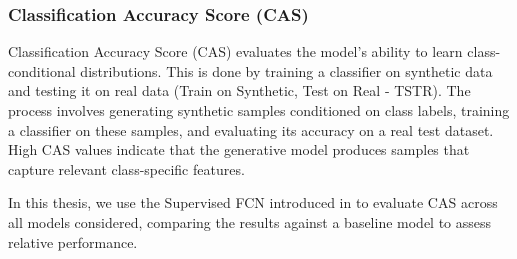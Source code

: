 \documentclass[../../thesis.tex]{subfiles}
\begin{document}
\subsubsection{Classification Accuracy Score (CAS)}
Classification Accuracy Score (CAS) evaluates the model's ability to learn class-conditional distributions. This is done by training a classifier on synthetic data and testing it on real data (Train on Synthetic, Test on Real - TSTR). The process involves generating synthetic samples conditioned on class labels, training a classifier on these samples, and evaluating its accuracy on a real test dataset. High CAS values indicate that the generative model produces samples that capture relevant class-specific features.\newline

In this thesis, we use the Supervised FCN introduced in \cite{TimeVQVAE} to evaluate CAS across all models considered, comparing the results against a baseline model to assess relative performance.
\end{document}
